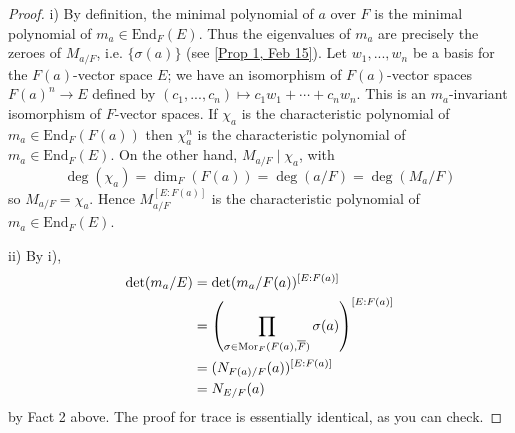\begin{proof}
	i) By definition, the minimal polynomial of $a$ over $F$ is the minimal polynomial of $m_a \in \text{End}_F(E)$. Thus the eigenvalues of $m_a$ are precisely the zeroes of $M_{a/F}$, i.e. $\{\sigma(a)\}$ (see \ref{Prop 1, Feb 15}). Let $w_1, ..., w_n$ be a basis for the $F(a)$-vector space $E$; we have an isomorphism of $F(a)$-vector spaces $F(a)^n \rightarrow E$ defined by $(c_1, ..., c_n) \mapsto c_1w_1 + \cdots + c_nw_n$. This is an $m_a$-invariant isomorphism of $F$-vector spaces. If $\chi_a$ is the characteristic polynomial of $m_a \in \text{End}_F(F(a))$ then $\chi_a^n$ is the characteristic polynomial of $m_a \in \text{End}_F(E)$. On the other hand, $M_{a/F} \mid \chi_a$, with 
		\[\deg(\chi_a) = \dim_F(F(a)) = \deg(a/F) = \deg(M_a/F)\]
	so $M_{a/F} = \chi_a$. Hence $M_{a/F}^{[E : F(a)]}$ is the characteristic polynomial of $m_a \in \text{End}_F(E)$.
	
	ii) By i), 
		\begin{align*}
			\det(m_a/E) &= \det(m_a/F(a))^{[E : F(a)]} \\
			&= \left( \prod_{\sigma \in \operatorname{Mor}_F(F(a), \overline{F})} \sigma(a) \right)^{[E : F(a)]} \\
			&= (N_{F(a)/F}(a))^{[E : F(a)]} \\
			&= N_{E/F}(a)
		\end{align*}
	by Fact 2 above. The proof for trace is essentially identical, as you can check.
\end{proof}